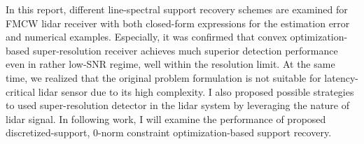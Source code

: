 \documentclass[11pt,journal, onecolumn]{IEEEtran}
\theoremstyle{theorem}
\begin{document}
In this report, different line-spectral support recovery schemes are examined for FMCW lidar receiver with both closed-form expressions for the estimation error and numerical examples. Especially, it was confirmed that convex optimization-based super-resolution receiver achieves much superior detection performance even in rather low-SNR regime, well within the resolution limit. At the same time, we realized that the original problem formulation is not suitable for latency-critical lidar sensor due to its high complexity. I also proposed possible strategies to used super-resolution detector in the lidar system by leveraging the nature of lidar signal. In following work, I will examine the performance of proposed discretized-support, 0-norm constraint optimization-based support recovery. 

\end{document}
